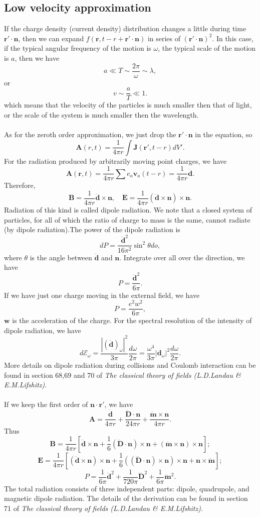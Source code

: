 \subsection{Low velocity approximation}
If the charge density (current density) distribution changes a little during time $\bm{r}'\cdot\bm{n}$, then we can expand $f(\bm{r},t-r+\bm{r}'\cdot\bm{n})$ in series of $(\bm{r}'\cdot\bm{n})^2$. In this case, if the typical angular frequency of the motion is $\omega$, the typical scale of the motion is $a$, then we have
\[a \ll T \sim \frac{2\pi}{\omega} \sim \lambda,\]
or
\[v \sim \frac{a}{T} \ll 1.\]
which means that the velocity of the particles is much smaller then that of light, or the scale of the system is much smaller then the wavelength.
\\ \\
As for the zeroth order approximation, we just drop the $\bm{r}'\cdot\bm{n}$ in the equation, so
\[\bm{A}(r,t) = \frac{1}{4\pi r} \int \bm{J}(\bm{r}',t-r) dV'.\]
For the radiation produced by arbitrarily moving point charges, we have
\[\bm{A}(\bm{r},t) = \frac{1}{4\pi r} \sum e_a \bm{v}_a(t-r) = \frac{1}{4\pi r} \dot{\bm{d}}.\]
Therefore,
\[\bm{B} = \frac{1}{4\pi r} \ddot{\bm{d}} \times \bm{n} , \quad \bm{E} = \frac{1}{4\pi r} (\ddot{\bm{d}} \times \bm{n})\times \bm{n}.\]
Radiation of this kind is called dipole radiation. 
We note that a closed system of particles, for all of which the ratio of charge to mass is the same, cannot radiate (by dipole radiation).The power of the dipole radiation is
\[dP = \frac{\ddot{\bm{d}}^2}{16\pi^2} \sin^2\theta do,\]
where $\theta$ is the angle between $\ddot{\bm{d}}$ and $\bm{n}$.
Integrate over all over the direction, we have
\[P = \frac{\ddot{\bm{d}}^2}{6\pi}.\]
If we have just one charge moving in the external field, we have
\[P = \frac{e^2 w^2}{6\pi},\]
$\bm{w}$ is the acceleration of the charge.
For the spectral resolution of the intensity of dipole radiation, we have
\[d\mathcal{E}_{\omega} = \frac{|(\ddot{\bm{d}})_{\omega}|^2}{3\pi}\frac{d\omega}{2\pi} = \frac{\omega^4}{3\pi}|\bm{d}_{\omega}|^2 \frac{d\omega}{2\pi}.\]
More details on dipole radiation during collisions and Coulomb interaction can be found in section 68,69 and 70 of \emph{The classical theory of fields (L.D.Landau \& E.M.Lifshitz)}.
\\ \\
If we keep the first order of $\bm{n}\cdot\bm{r}'$, we have
\[\bm{A} = \frac{\dot{\bm{d}}}{4\pi r} + \frac{\ddot{\bm{D}}\cdot\bm{n}}{24\pi r} + \frac{\dot{\bm{m}}\times \bm{n}}{4\pi r}.\]
Thus
\[\bm{B} = \frac{1}{4\pi r} \left[ \ddot{\bm{d}} \times \bm{n} + \frac{1}{6} (\dddot{\bm{D}} \cdot \bm{n}) \times\bm{n} + (\ddot{\bm{m}}\times\bm{n})\times\bm{n}\right];\]
\[\bm{E} = \frac{1}{4\pi r} \left[ (\ddot{\bm{d}} \times \bm{n})\times \bm{n} + \frac{1}{6}((\dddot{\bm{D}} \cdot \bm{n})\times\bm{n})\times \bm{n} + \bm{n} \times \ddot{\bm{m}}\right];\]
\[P = \frac{1}{6\pi}\ddot{\bm{d}}^2 + \frac{1}{720\pi} \dddot{\bm{D}}^2 + \frac{1}{6\pi} \ddot{\bm{m}}^2.\]
The total radiation consists of three independent parts:
dipole, quadrupole, and magnetic dipole radiation. The details of the derivation can be found in section 71 of \emph{The classical theory of fields (L.D.Landau \& E.M.Lifshitz)}.

